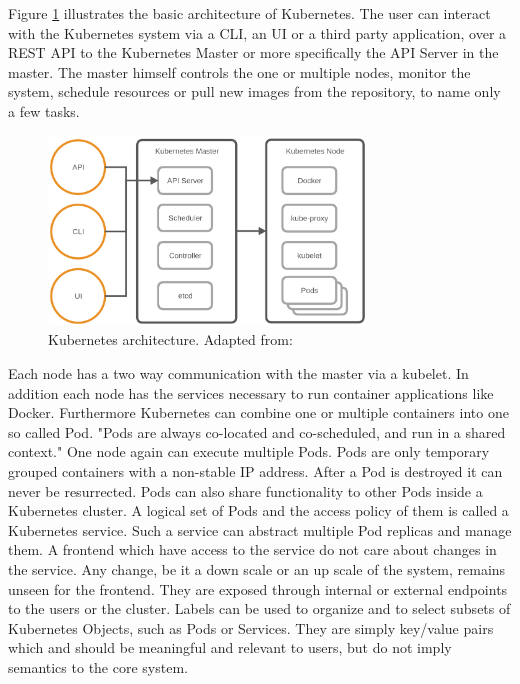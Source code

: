 Figure \ref{fig:kubernetes_architecture} illustrates the basic architecture of Kubernetes.
The user can interact with the Kubernetes system via a \ac{CLI}, an \ac{UI} or a third party application, over a \ac{REST} \ac{API} to the Kubernetes Master or more specifically the \ac{API} Server in the master.
The master himself controls the one or multiple nodes, monitor the system, schedule resources or pull new images from the repository, to name only a few tasks.

\begin{figure}[H]
    \centering
    \includegraphics[width=0.75\textwidth]{resources/images/kubernetes_architecture.png}
    \caption[Kubernetes architecture]{Kubernetes architecture. Adapted from: \cite[p. 4]{MSV:2016}}
    \label{fig:kubernetes_architecture}
\end{figure}

Each node has a two way communication with the master via a kubelet.
In addition each node has the services necessary to run container applications like Docker.
Furthermore Kubernetes can combine one or multiple containers into one so called Pod.\cite[cf.][p. 7]{Mulyana:2016}
"Pods are always co-located and co-scheduled, and run in a shared context."\cite{Kubernetes:pods:2016}
One node again can execute multiple Pods.
Pods are only temporary grouped containers with a non-stable \ac{IP} address.
After a Pod is destroyed it can never be resurrected.
Pods can also share functionality to other Pods inside a Kubernetes cluster.
A logical set of Pods and the access policy of them is called a Kubernetes service.
Such a service can abstract multiple Pod replicas and manage them.
A frontend which have access to the service do not care about changes in the service.
Any change, be it a down scale or an up scale of the system, remains unseen for the frontend.
They are exposed through internal or external endpoints to the users or the cluster.\cite[cf.][p. 11]{MSV:2016}
Labels can be used to organize and to select subsets of Kubernetes Objects, such as Pods or Services.\cite[cf.]{Kubernetes:labels:2016}
They are simply key/value pairs which and should be meaningful and relevant to users, but do not imply semantics to the core system.\cite[cf.]{Kubernetes:labels:2016}

